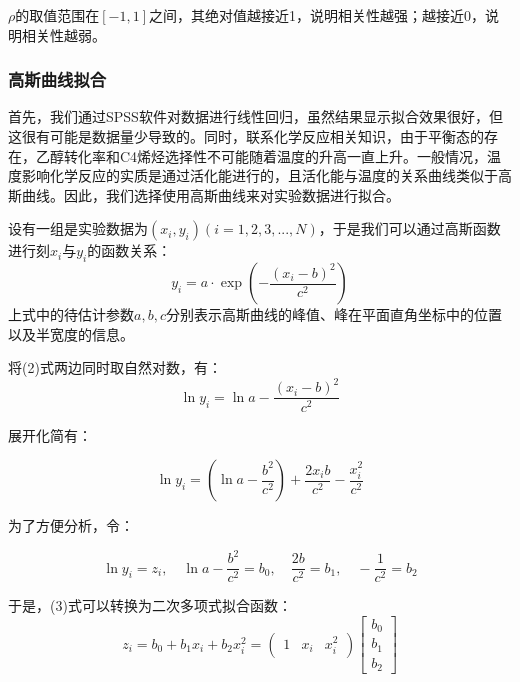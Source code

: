 \documentclass[withoutpreface,bwprint]{cumcmthesis} %
\begin{document}
$\rho$的取值范围在$[-1,1]$之间，其绝对值越接近1，说明相关性越强；越接近0，说明相关性越弱。

\subsubsection{高斯曲线拟合}
首先，我们通过SPSS软件对数据进行线性回归，虽然结果显示拟合效果很好，但这很有可能是数据量少导致的。同时，联系化学反应相关知识，由于平衡态的存在，乙醇转化率和C4烯烃选择性不可能随着温度的升高一直上升。一般情况，温度影响化学反应的实质是通过活化能进行的，且活化能与温度的关系曲线类似于高斯曲线。因此，我们选择使用高斯曲线来对实验数据进行拟合。

设有一组是实验数据为$(x_i, y_i)(i = 1, 2,3,...,N)$，于是我们可以通过高斯函数进行刻$x_i$与$y_i$的函数关系：
\begin{equation}
	y_i=a \cdot \exp \left(-\frac{(x_i-b)^{2}}{c^2}\right)
\end{equation}
上式中的待估计参数$a,b,c$分别表示高斯曲线的峰值、峰在平面直角坐标中的位置以及半宽度的信息。

将(2)式两边同时取自然对数，有：
\begin{equation*}
	\ln y_{i}=\ln a-\frac{\left(x_{i}-b\right)^{2}}{c^2}
\end{equation*}

展开化简有：

\begin{equation}
	\ln y_{i}=\left(\ln a-\frac{b^{2}}{c^2}\right)+\frac{2 x_{i} b}{c^2}-\frac{x_{i}^{2}}{c^2}
\end{equation}

为了方便分析，令：

\begin{equation*}
	\ln y_{i}=z_{i}, \quad \ln a-\frac{b^{2}}{c^2}=b_{0}, \quad \frac{2 b}{c^2}=b_{1}, \quad-\frac{1}{c^2}=b_{2}
\end{equation*}

于是，(3)式可以转换为二次多项式拟合函数：
\begin{equation*}
	z_{i}=b_{0}+b_{1} x_{i}+b_{2} x_{i}^{2}=\left(\begin{array}{lll}
		1 & x_{i} & x_{i}^{2}
	\end{array}\right)\left[\begin{array}{l}
		b_{0} \\
		b_{1} \\
		b_{2}
	\end{array}\right]
\end{equation*}
\end{document}
